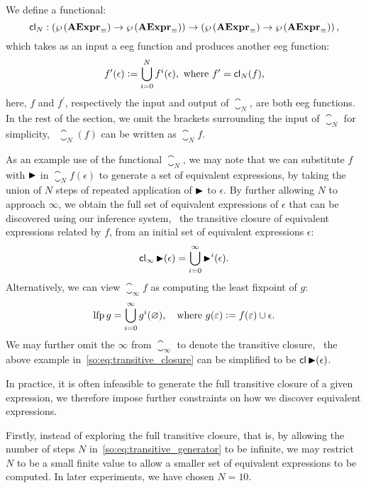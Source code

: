 We define a functional:
\begin{equation}
    \operatorname{\mathsf{cl}}_N:
        \left( \wp\left({\mathbf{AExpr}_\equiv}\right) \to \wp\left({\mathbf{AExpr}_\equiv}\right) \right) \to
        \left( \wp\left({\mathbf{AExpr}_\equiv}\right) \to \wp\left({\mathbf{AExpr}_\equiv}\right) \right),
\end{equation}
which takes as an input a \gls{eeg} function and produces another \gls{eeg}
function:
\begin{equation}
    f^\prime (\epsilon) \vcentcolon=
        \bigcup_{i = 0}^N f^i(\epsilon),
    \text{~where~} f^\prime = \operatorname{\mathsf{cl}}_N (f),
    \label{so:eq:transitive_generator}
\end{equation}
here, $f$ and $f^\prime$, respectively the input and output of $\closure_N$,
are both \gls{eeg} functions.  In the rest of the section, we omit the brackets
surrounding the input of $\closure_N$ for simplicity, \eg~$\closure_N (f)$ can
be written as $\closure_N f$.

As an example use of the functional $\closure_N$, we may note that we can
substitute $f$ with $\operatorname{\blacktriangleright}$ in $\closure_N f (\epsilon)$ to generate a
set of equivalent expressions, by taking the union of $N$ steps of repeated
application of $\operatorname{\blacktriangleright}$ to $\epsilon$.  By further allowing $N$ to approach
$\infty$, we obtain the full set of equivalent expressions of $\epsilon$ that
can be discovered using our inference system, \ie~the transitive closure of
equivalent expressions related by $f$, from an initial set of equivalent
expressions $\epsilon$:
\begin{equation}
    \operatorname{\mathsf{cl}}_\infty \operatorname{\blacktriangleright} (\epsilon) =
        \bigcup_{i = 0}^\infty \operatorname{\blacktriangleright}^i(\epsilon).
    \label{so:eq:transitive_closure}
\end{equation}
Alternatively, we can view $\closure_\infty f$ as computing the
least fixpoint of $g$:
\begin{equation}
    \operatorname{\mathrm{lfp}} g = \bigcup_{i = 0}^\infty g^i(\varnothing),
    \quad \text{where~} g(\varepsilon) \vcentcolon= f(\varepsilon) \cup \epsilon.
\end{equation}
We may further omit the $\infty$ from $\closure_\infty$ to denote the
transitive closure, \eg~the above example in~\eqref{so:eq:transitive_closure}
can be simplified to be $\operatorname{\mathsf{cl}} \operatorname{\blacktriangleright} (\epsilon)$.

In practice, it is often infeasible to generate the full transitive closure of
a given expression, we therefore impose further constraints on how we discover
equivalent expressions.

Firstly, instead of exploring the full transitive closure, that is, by allowing
the number of steps $N$ in~\eqref{so:eq:transitive_generator} to be infinite,
we may restrict $N$ to be a small finite value to allow a smaller set of
equivalent expressions to be computed.  In later experiments, we have chosen $N
= 10$.

